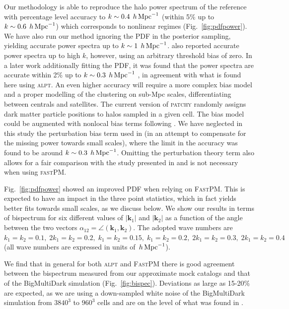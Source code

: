 Our methodology is able to reproduce the halo power spectrum of the reference with percentage level accuracy to $k \sim 0.4 \; \,h\,{\rm Mpc}^{-1}$ (within 5\% up to $k \sim 0.6 \; \,h\,{\rm Mpc}^{-1}$) which corresponds to  nonlinear regimes (Fig.~\ref{fig:pdfpower}). We have also run our method ignoring the PDF in the posterior sampling, yielding accurate power spectra up to $k\sim 1 \; \,h\,{\rm Mpc}^{-1}$. \citet[][]{kitaura2014} also reported accurate power spectra up to high $k$, however, using an arbitrary threshold bias of zero. In a later work additionally fitting the PDF, it was found that the power spectra are accurate within 2\% up to $k\sim 0.3 \; \,h\,{\rm Mpc}^{-1}$ \citep[][]{kitaura2015}, in agreement with what is found here using \textsc{alpt}. 
An even higher accuracy will require a more  complex bias model and a proper modelling of the clustering on sub-Mpc scales, differentiating between centrals and satellites. The current version of \textsc{patchy} randomly assigns dark matter particle positions to halos sampled in a given cell.
The bias model could be augmented with nonlocal bias terms following \citet[][]{mcdonald2009}. We have neglected in this study the perturbation bias term used in \citet{kitaura2016} (in an attempt to compensate for the missing power towards small scales), where the limit in the accuracy was found to be around $k\sim 0.3 \; \,h\,{\rm Mpc}^{-1}$. Omitting the perturbation theory term also allows for a fair comparison with the study presented in \citet[][]{kitaura2015} and is not necessary when using \textsc{fastPM}. 

Fig.~\ref{fig:pdfpower} showed an improved PDF when relying on \textsc{FastPM}. This is expected to have an impact in the three point statistics, which in fact yields better fits towards small scales, as we discuss below. 
We show our results in terms of bispectrum for six different values of $|\mathbf{k}_1|$ and $|\mathbf{k}_2|$ as a function of the angle between the two vectors $\alpha_{12} = \angle (\mathbf{k}_1 , \mathbf{k}_2)$. The adopted wave numbers are $k_1=k_2=0.1,\; 2k_1=k_2=0.2,\; k_1=k_2=0.15,\; k_1=k_2=0.2,\; 2k_1=k_2=0.3,\; 2k_1=k_2=0.4$ (all wave numbers are expressed in units of $\,h\,{\rm Mpc}^{-1}$). 

We find that in general for both \textsc{alpt} and \textsc{FastPM} there is good agreement between the bispectrum measured from our approximate mock catalogs and that of the BigMultiDark simulation (Fig.~\ref{fig:bispec}). 
Deviations as large as 15-20\% are expected, as we are using a down-sampled  white noise of the BigMultiDark simulation from $3840^3$ to $960^3$ cells and are on the level of what was found in \citet[][]{kitaura2015}. 

